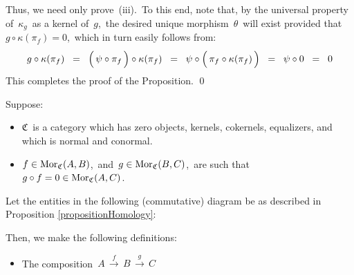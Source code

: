 Thus, we need only prove \,(iii).\,
To this end, note that, by the universal property of \,$\kappa_{g}$\, as a kernel of \,$g$,\,
the desired unique morphism \,$\theta$\, will exist provided that \,$g \circ \kappa(\pi_{f}) = 0$,\,
which in turn easily follows from:
\begin{equation*}
g \circ \kappa(\pi_{f})
\;\; = \;\;
	\left(\,\psi \overset{{\color{white}!}}{\circ} \pi_{f}\,\right) \circ \kappa(\pi_{f})
\;\; = \;\;
	\psi \circ \left(\,\pi_{f} \overset{{\color{white}!}}{\circ} \kappa(\pi_{f})\,\right)
\;\; = \;\;
	\psi \circ 0
\;\; = \;\;
	0
\end{equation*}
This completes the proof of the Proposition.
\qed


\vskip 0.5cm
\begin{definition}
\mbox{}
\vskip 0.1cm
\noindent
Suppose:
\begin{itemize}
\item
	$\mathfrak{C}$\, is a category which has zero objects, kernels, cokernels, equalizers, and which is normal and conormal.
\item
	$f \in \textnormal{Mor}_{\mathfrak{C}}(A,B)$,\, and \,$g \in \textnormal{Mor}_{\mathfrak{C}}(B,C)$,\,
	are such that
	\,$g \circ f = 0 \in \textnormal{Mor}_{\mathfrak{C}}(A,C)$.\,
\end{itemize}
Let the entities in the following (commutative) diagram be as described in Proposition \ref{propositionHomology}:
\begin{center}
\end{center}
Then, we make the following definitions:
\begin{itemize}
\item
	The composition
	\,$A \,\overset{f}{\longrightarrow}\, B \,\overset{g}{\longrightarrow}\, C$\,

\end{itemize}
\end{definition}
